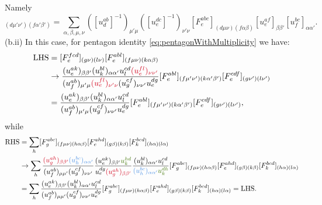 \documentclass{book}
\begin{document}
Namely
\begin{equation*}
[\tilde{F}_{e}^{abc} ]_{(d\mu '\nu ' )( f\alpha '\beta ')} =\sum _{\alpha ,\beta ,\mu ,\nu } ([u_{d}^{ab} ]^{-1} )_{\mu '\mu } ([u_{e}^{dc} ]^{-1} )_{\nu '\nu } [F_{e}^{abc} ]_{(d\mu \nu )(f\alpha \beta )} [u_{e}^{af} ]_{\beta \beta '} [u_{f}^{bc} ]_{\alpha \alpha '} .
\end{equation*}
(b.ii) In this case, for pentagon identity \eqref{eq:pentagonWithMultiplicity} we have:
\begin{equation*}
\begin{aligned}
\mathrm{LHS} & =[F_{e}^{fcd} ]_{( g\nu )( l\nu )} [F_{e}^{abl} ]_{( f\mu \nu )( k\alpha \beta )}\\
 & \rightarrow \frac{(u_{e}^{ak} )_{\beta \beta '} (u_{k}^{bl} )_{\alpha \alpha '} u_{l}^{cd}\textcolor[rgb]{0.82,0.01,0.11}{(u_{e}^{fl} )_{\nu \nu '}}}{(u_{f}^{ab} )_{\mu '\mu }\textcolor[rgb]{0.82,0.01,0.11}{(u_{e}^{fl} )_{\nu '\nu }} (u_{g}^{cf} )_{\nu \nu '} u_{e}^{dg}} [F_{e}^{abl} ]_{( f\mu '\nu ')( k\alpha '\beta ')} [F_{e}^{cdf} ]_{( g\nu ')( l\nu ')}\\
 & =\frac{(u_{e}^{ak} )_{\beta \beta '} (u_{k}^{bl} )_{\alpha \alpha '} u_{l}^{cd}}{(u_{f}^{ab} )_{\mu '\mu } (u_{g}^{cf} )_{\nu \nu '} u_{e}^{dg}} [F_{e}^{abl} ]_{( f\mu '\nu ')( k\alpha '\beta ')} [F_{e}^{cdf} ]_{( g\nu ')( l\nu ')} ,
\end{aligned}
\end{equation*}
while
\begin{equation*}
\begin{aligned}
\mathrm{RHS} & =\sum _{h} [F_{g}^{abc} ]_{( f\mu \nu )( h\alpha \beta )} [F_{e}^{ahd} ]_{( g\beta )( k\beta )} [F_{k}^{bcd} ]_{( h\alpha )( l\alpha )}\\
 & \rightarrow \sum _{h}\frac{\textcolor[rgb]{0.82,0.01,0.11}{(u}\textcolor[rgb]{0.82,0.01,0.11}{_{g}^{ah}}\textcolor[rgb]{0.82,0.01,0.11}{)}\textcolor[rgb]{0.82,0.01,0.11}{_{\beta \beta '}}\textcolor[rgb]{0.29,0.56,0.89}{(u}\textcolor[rgb]{0.29,0.56,0.89}{_{h}^{bc}}\textcolor[rgb]{0.29,0.56,0.89}{)}\textcolor[rgb]{0.29,0.56,0.89}{_{\alpha \alpha '}}}{(u_{f}^{ab} )_{\mu \mu '} (u_{g}^{cf} )_{\nu \nu '}}  \frac{(u_{e}^{ak} )_{\beta \beta '}\textcolor[rgb]{0.25,0.46,0.02}{u}\textcolor[rgb]{0.25,0.46,0.02}{_{k}^{hd}}}{u_{e}^{dg}\textcolor[rgb]{0.82,0.01,0.11}{(u}\textcolor[rgb]{0.82,0.01,0.11}{_{g}^{ah}}\textcolor[rgb]{0.82,0.01,0.11}{)}\textcolor[rgb]{0.82,0.01,0.11}{_{\beta \beta '}}}  \frac{(u_{k}^{bl} )_{\alpha \alpha '} u_{l}^{cd}}{\textcolor[rgb]{0.29,0.56,0.89}{(u}\textcolor[rgb]{0.29,0.56,0.89}{_{h}^{bc}}\textcolor[rgb]{0.29,0.56,0.89}{)}\textcolor[rgb]{0.29,0.56,0.89}{_{\alpha \alpha '}}\textcolor[rgb]{0.25,0.46,0.02}{u}\textcolor[rgb]{0.25,0.46,0.02}{_{k}^{dh}}} [F_{g}^{abc} ]_{( f\mu \nu )( h\alpha \beta )} [F_{e}^{ahd} ]_{( g\beta )( k\beta )} [F_{k}^{bcd} ]_{( h\alpha )( l\alpha )}\\
 & =\sum _{h}\frac{(u_{e}^{ak} )_{\beta \beta '} (u_{k}^{bl} )_{\alpha \alpha '} u_{l}^{cd}}{(u_{f}^{ab} )_{\mu \mu '} (u_{g}^{cf} )_{\nu \nu '} u_{e}^{dg}} [F_{g}^{abc} ]_{( f\mu \nu )( h\alpha \beta )} [F_{e}^{ahd} ]_{( g\beta )( k\beta )} [F_{k}^{bcd} ]_{( h\alpha )( l\alpha )} =\mathrm{LHS} .
\end{aligned}
\end{equation*}
\end{document}
